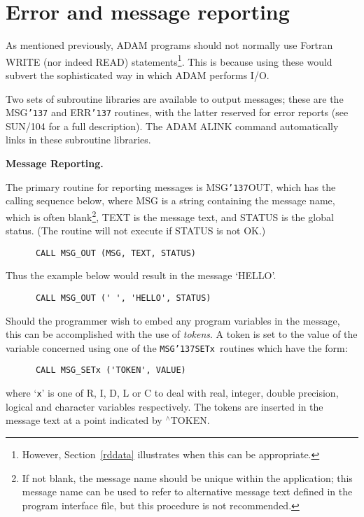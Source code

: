 \documentclass[twoside,11pt]{article}
\renewcommand{\_}{{\tt\char'137}}
\newcommand{\xref}[3]{#1}
\newcommand{\xlabel}[1]{}
\begin{document}
\newpage
\section{Error and message reporting\label{repdim1}\xlabel{error_and_message_reporting}}

As mentioned previously, ADAM programs should not
normally use Fortran WRITE (nor indeed READ) 
statements\footnote{However, Section~\ref{rddata} illustrates when this can be 
appropriate.}.
This is because using these would subvert the sophisticated way
in which ADAM performs I/O.

Two sets of subroutine libraries are available to output
messages; these are the MSG\_  and ERR\_ routines, with the latter
reserved for error reports
(see \xref{SUN/104}{sun104}{} for a full description).
The ADAM ALINK command automatically links in these subroutine libraries.

{\bigskip\large\bf Message Reporting.}

The primary routine for reporting messages is MSG\_OUT, which has the 
calling sequence below, where MSG is a string containing the message 
name, which is often blank\footnote{If not blank, the message name should 
be unique within the application;
this message name can be used to refer to alternative message text defined 
in the program interface file, but this procedure is
not recommended.}, 
TEXT is the message text, and STATUS is the global status.
(The routine will not execute if STATUS is not OK.)
\begin{verbatim}
      CALL MSG_OUT (MSG, TEXT, STATUS) 
\end{verbatim}
Thus the example below would result in the message `HELLO'.
\begin{verbatim}
      CALL MSG_OUT (' ', 'HELLO', STATUS) 
\end{verbatim}
Should the programmer wish to embed any program variables in
the message, this can be accomplished with the use of  {\sl tokens}.
A token is set to the value of the variable concerned
using one of the {\tt MSG\_SETx}\  routines which have the form:
\begin{verbatim}      
      CALL MSG_SETx ('TOKEN', VALUE)
\end{verbatim}
where `{\tt x}' is one of R, I, D, L or
C to deal with real, integer, double precision, logical and
character variables respectively.
The tokens are inserted in the message text
at a point indicated by $^\wedge$TOKEN.
\end{document}
